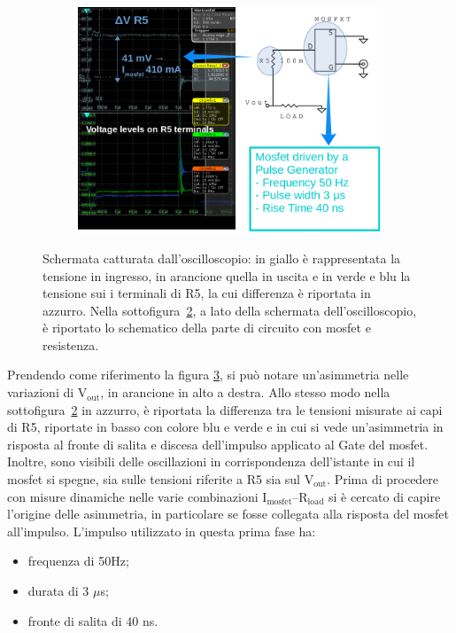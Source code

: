 \begin{figure}
\begin{subfigure}{.5\textwidth}
  \caption{ }
  \label{TransientTest:sfig2}
\end{subfigure}
\begin{subfigure}{\textwidth}
  \centering
  \includegraphics[width=0.9\linewidth]{Immagini/zoomTransientTest3bis}
  \caption{ }
  \label{TransientTest:sfig3}
\end{subfigure}
\caption{Schermata catturata dall'oscilloscopio: in giallo è rappresentata la tensione in ingresso, in arancione quella in uscita e in verde e blu la tensione sui i terminali di R5, la cui differenza è riportata in  azzurro. Nella sottofigura~\ref{TransientTest:sfig3}, a lato della schermata dell'oscilloscopio, è riportato lo schematico della parte di circuito con mosfet e resistenza.}
\label{TransientTest}
\end{figure}

Prendendo come riferimento la figura \ref{TransientTest}, si può notare un'asimmetria nelle variazioni di $\mathrm{V_{out}}$, in arancione in alto a destra.%
Allo stesso modo nella sottofigura~\ref{TransientTest:sfig3} in azzurro, è riportata la differenza tra le tensioni misurate ai capi di R5, riportate in basso con colore blu e verde e in cui si vede un'asimmetria in risposta al fronte di salita e discesa dell'impulso applicato al Gate del mosfet. 
Inoltre, sono visibili delle oscillazioni in corrispondenza dell'istante in cui il mosfet si spegne, sia sulle tensioni riferite a R5 sia sul $\mathrm{V_{out}}$.
Prima di procedere con misure dinamiche nelle varie combinazioni $\mathrm{I_{mosfet}}$--$\mathrm{R_{load}}$ si è cercato di capire l'origine delle asimmetria, in particolare se fosse collegata alla risposta del mosfet all'impulso.
L'impulso utilizzato in questa prima fase ha:
\begin{itemize}
  \item frequenza di 50Hz;
  \item durata di 3 $\mu$s;
  \item fronte di salita di 40 ns.
\end{itemize}

